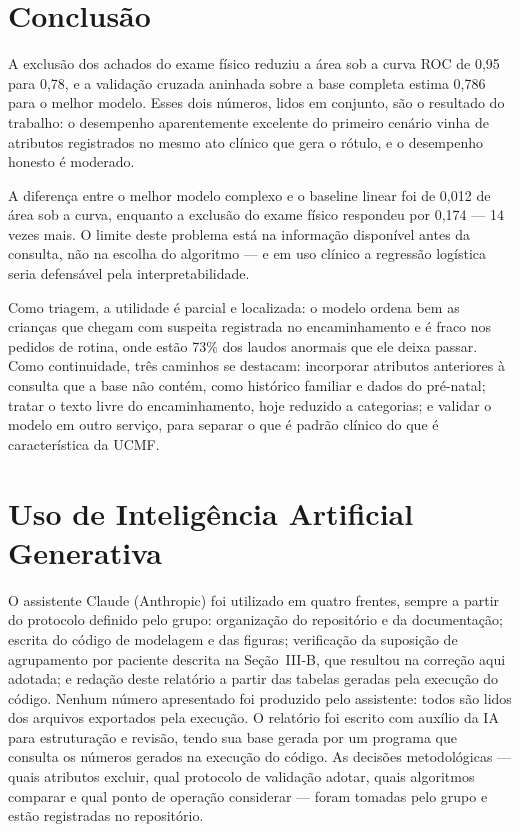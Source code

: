 \documentclass[conference]{IEEEtran}
\begin{document}
\section{Conclusão}
A exclusão dos achados do exame físico reduziu a área sob a curva ROC de 0,95 para 0,78, e a validação cruzada aninhada sobre a base completa estima 0,786 para o melhor modelo. Esses dois números, lidos em conjunto, são o resultado do trabalho: o desempenho aparentemente excelente do primeiro cenário vinha de atributos registrados no mesmo ato clínico que gera o rótulo, e o desempenho honesto é moderado.

A diferença entre o melhor modelo complexo e o baseline linear foi de 0,012 de área sob a curva, enquanto a exclusão do exame físico respondeu por 0,174 --- 14 vezes mais. O limite deste problema está na informação disponível antes da consulta, não na escolha do algoritmo --- e em uso clínico a regressão logística seria defensável pela interpretabilidade.

Como triagem, a utilidade é parcial e localizada: o modelo ordena bem as crianças que chegam com suspeita registrada no encaminhamento e é fraco nos pedidos de rotina, onde estão 73\% dos laudos anormais que ele deixa passar. Como continuidade, três caminhos se destacam: incorporar atributos anteriores à consulta que a base não contém, como histórico familiar e dados do pré-natal; tratar o texto livre do encaminhamento, hoje reduzido a categorias; e validar o modelo em outro serviço, para separar o que é padrão clínico do que é característica da UCMF.

\section{Uso de Inteligência Artificial Generativa}
O assistente Claude (Anthropic) foi utilizado em quatro frentes, sempre a partir do protocolo definido pelo grupo: organização do repositório e da documentação; escrita do código de modelagem e das figuras; verificação da suposição de agrupamento por paciente descrita na Seção~III-B, que resultou na correção aqui adotada; e redação deste relatório a partir das tabelas geradas pela execução do código. Nenhum número apresentado foi produzido pelo assistente: todos são lidos dos arquivos exportados pela execução. O relatório foi escrito com auxílio da IA para estruturação e revisão, tendo sua base gerada por um programa que consulta os números gerados na execução do código. As decisões metodológicas --- quais atributos excluir, qual protocolo de validação adotar, quais algoritmos comparar e qual ponto de operação considerar --- foram tomadas pelo grupo e estão registradas no repositório.
\end{document}
